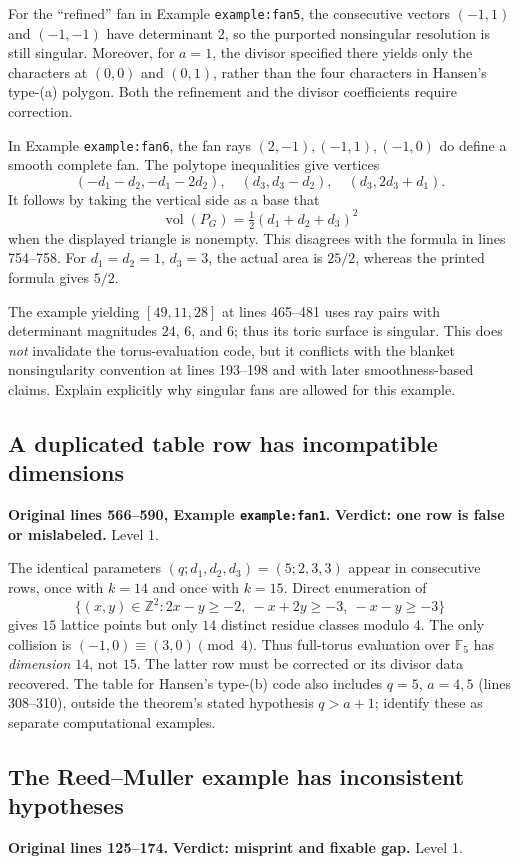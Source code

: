 \documentclass[12pt,letterpaper]{article}
\DeclareMathOperator{\vol}{vol}
\newcommand{\F}{\mathbb F}
\newcommand{\Z}{\mathbb Z}
\newcommand{\err}[1]{\textbf{#1}}
\newcommand{\level}[1]{\textsf{Level #1}}
\begin{document}
For the ``refined'' fan in Example \texttt{example:fan5}, the consecutive vectors $(-1,1)$ and $(-1,-1)$ have determinant $2$, so the purported nonsingular resolution is still singular.  Moreover, for $a=1$, the divisor specified there yields only the characters at $(0,0)$ and $(0,1)$, rather than the four characters in Hansen's type-(a) polygon.  Both the refinement and the divisor coefficients require correction.

In Example \texttt{example:fan6}, the fan rays $(2,-1),(-1,1),(-1,0)$ do define a smooth complete fan.  The polytope inequalities give vertices
\[
(-d_1-d_2,-d_1-2d_2),\quad
(d_3,d_3-d_2),\quad
(d_3,2d_3+d_1).
\]
It follows by taking the vertical side as a base that
\[
\vol(P_G)=\tfrac12(d_1+d_2+d_3)^2
\]
when the displayed triangle is nonempty.  This disagrees with the formula in lines 754--758.  For $d_1=d_2=1$, $d_3=3$, the actual area is $25/2$, whereas the printed formula gives $5/2$.

The example yielding $[49,11,28]$ at lines 465--481 uses ray pairs with determinant magnitudes $24$, $6$, and $6$; thus its toric surface is singular.  This does \emph{not} invalidate the torus-evaluation code, but it conflicts with the blanket nonsingularity convention at lines 193--198 and with later smoothness-based claims.  Explain explicitly why singular fans are allowed for this example.

\subsection{A duplicated table row has incompatible dimensions}\label{sec:table}
\textbf{Original lines 566--590, Example \texttt{example:fan1}.}\quad
\err{Verdict: one row is false or mislabeled.} \level{1}.

The identical parameters $(q;d_1,d_2,d_3)=(5;2,3,3)$ appear in consecutive rows, once with $k=14$ and once with $k=15$.  Direct enumeration of
\[
\bigl\{(x,y)\in\Z^2:2x-y\ge-2,\ -x+2y\ge-3,\ -x-y\ge-3\bigr\}
\]
gives $15$ lattice points but only $14$ distinct residue classes modulo $4$.  The only collision is $(-1,0)\equiv(3,0)\pmod4$.  Thus full-torus evaluation over $\F_5$ has \emph{dimension $14$}, not $15$.  The latter row must be corrected or its divisor data recovered.  The table for Hansen's type-(b) code also includes $q=5$, $a=4,5$ (lines 308--310), outside the theorem's stated hypothesis $q>a+1$; identify these as separate computational examples.

\subsection{The Reed--Muller example has inconsistent hypotheses}\label{sec:reedmuller}
\textbf{Original lines 125--174.}\quad
\err{Verdict: misprint and fixable gap.} \level{1}.
\end{document}
